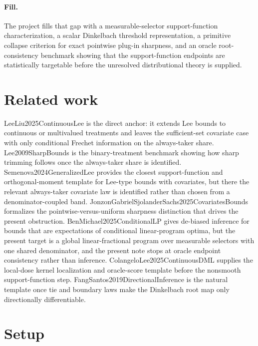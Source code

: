 \documentclass{article}
\begin{document}
\paragraph{Fill.} The project fills that gap with a measurable-selector support-function characterization, a scalar Dinkelbach threshold representation, a primitive collapse criterion for exact pointwise plug-in sharpness, and an oracle root-consistency benchmark showing that the support-function endpoints are statistically targetable before the unresolved distributional theory is supplied.

\section{Related work}

LeeLiu2025ContinuousLee is the direct anchor: it extends Lee bounds to continuous or multivalued treatments and leaves the sufficient-set covariate case with only conditional Frechet information on the always-taker share. Lee2009SharpBounds is the binary-treatment benchmark showing how sharp trimming follows once the always-taker share is identified. Semenova2024GeneralizedLee provides the closest support-function and orthogonal-moment template for Lee-type bounds with covariates, but there the relevant always-taker covariate law is identified rather than chosen from a denominator-coupled band. JonzonGabrielSjolanderSachs2025CovariatesBounds formalizes the pointwise-versus-uniform sharpness distinction that drives the present obstruction. BenMichael2025ConditionalLP gives de-biased inference for bounds that are expectations of conditional linear-program optima, but the present target is a global linear-fractional program over measurable selectors with one shared denominator, and the present note stops at oracle endpoint consistency rather than inference. ColangeloLee2025ContinuousDML supplies the local-dose kernel localization and oracle-score template before the nonsmooth support-function step. FangSantos2019DirectionalInference is the natural template once tie and boundary laws make the Dinkelbach root map only directionally differentiable.

\section{Setup}
\end{document}
